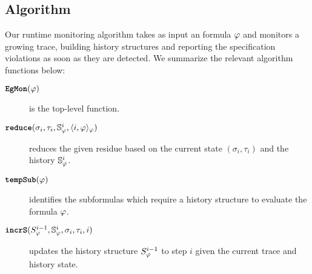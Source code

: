 



\subsection{\monitor Algorithm}
Our runtime monitoring algorithm \monitor takes as input an
\planguage formula $\varphi$ and monitors a growing trace,
building history structures and reporting the specification violations
as soon as they are detected. We summarize the relevant algorithm functions below:

\begin{description}
\item[$\textbf{\texttt{EgMon}}{}(\varphi)$] is the top-level function.
\item[$\textbf{\texttt{reduce}}(\sigma_i, \tau_i, \mathbb{S}^{i}_{\varphi}, \langle i, \varphi \rangle_{\varphi})$] reduces the given residue based on the current state $(\sigma_i,\tau_i)$ and the history $\mathbb{S}^{i}_{\varphi}$.
\item[$\textbf{\texttt{tempSub}}(\varphi)$] identifies the subformulas which require a history structure to evaluate the formula $\varphi$.
\item[$\textbf{\texttt{incrS}}({S}^{i-1}_{\varphi}, \mathbb{S}^{i}_{\varphi}, \sigma_i, \tau_i, i)$] updates the history structure ${S}^{i-1}_{\varphi}$ to step $i$ given the current trace and history state.
\end{description}




